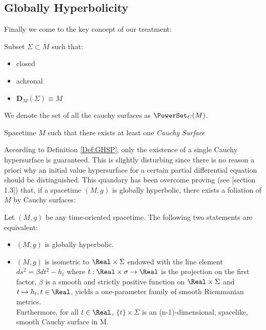 \documentclass[Main]{subfiles}
\begin{document}
		\subsection{Globally Hyperbolicity}
			Finally we come to the key concept of our treatment:
			
			\begin{definition}
				Subset $\Sigma \subset M$ such that:
				\begin{itemize}
					\item closed
					\item achronal
					\item $\mathbf{D}_M(\Sigma) \equiv M$
				\end{itemize}
			\end{definition}
			\begin{notationfix}
				We denote the set of all the cauchy surfaces as $\PowerSet_{C}(M)$.
			\end{notationfix}
		\begin{definition}\label{Def:GHSP}
			 Spacetime $M$ such that there exists at least one \emph{Cauchy Surface}
		\end{definition}

			According to Definition \ref{Def:GHSP}, only the existence of a single Cauchy hypersurface is guaranteed. 
			This is slightly disturbing since there is no reason a priori why an initial value hypersurface for a certain partial differential equation should be distinguished. 
			This quandary has been overcome proving (see \cite{Baer2008}[section 1.3]) that, if a spacetime $(M,g)$ is globally hyperbolic, there exists a foliation of $M$ by Cauchy surfaces:
			\begin{theorem}\label{Teo:GHSC_character}
				Let $(M,g)$ be any time-oriented spacetime. The following two statements are equivalent:
				\begin{itemize}
					\item $(M,g)$ is globally hyperbolic.
					\item $(M,g)$ is isometric to $ \Real \times \Sigma $ 
						endowed with the line element $ds^2 = \beta dt^2 - h_t$ 
						where $t : \Real \times \sigma \rightarrow \Real$ is the projection on the first factor, 
						$\beta$ is a smooth and strictly positive function on $\Real \times \Sigma$ 
						and $t \mapsto h_t , t \in \Real$, yields a one-parameter family of smooth Riemmanian metrics.\\
						Furthermore, for all $t\in \Real$, $\{t\}\times \Sigma$ is an (n-1)-dimensional, spacelike, smooth Cauchy surface in M.
				\end{itemize}
			\end{theorem}
			
\end{document}
